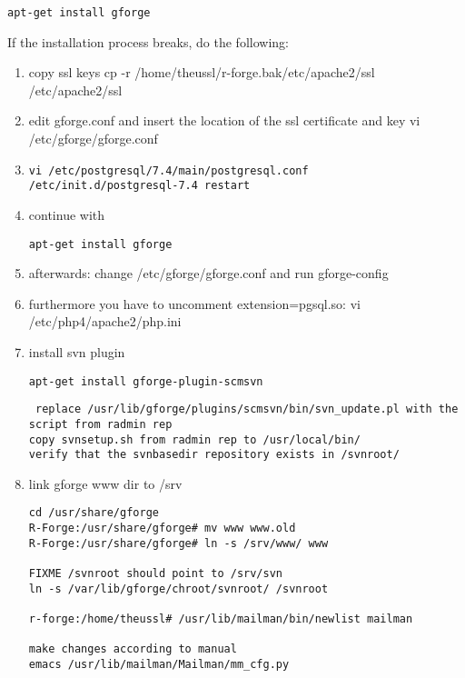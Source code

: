 \documentclass[a4paper]{article}
\begin{document}
\begin{lstlisting}[frame=single, framerule=0.95pt]
apt-get install gforge
\end{lstlisting}


If the installation process breaks, do the following:
\begin{enumerate}
\item copy ssl keys
cp -r /home/theussl/r-forge.bak/etc/apache2/ssl /etc/apache2/ssl
\item edit gforge.conf and insert the location of the ssl certificate and key
vi /etc/gforge/gforge.conf
\item 
\begin{lstlisting}
vi /etc/postgresql/7.4/main/postgresql.conf
/etc/init.d/postgresql-7.4 restart
\end{lstlisting}

\item continue with 

\begin{lstlisting}[frame=single, framerule=0.95pt]
apt-get install gforge
\end{lstlisting}

\item afterwards: change /etc/gforge/gforge.conf and run
gforge-config
\item furthermore you have to uncomment extension=pgsql.so:
vi /etc/php4/apache2/php.ini

\item install svn plugin

\begin{lstlisting}[frame=single, framerule=0.95pt]
apt-get install gforge-plugin-scmsvn
\end{lstlisting}

\begin{lstlisting} replace /usr/lib/gforge/plugins/scmsvn/bin/svn_update.pl with the script from radmin rep
copy svnsetup.sh from radmin rep to /usr/local/bin/
verify that the svnbasedir repository exists in /svnroot/
\end{lstlisting}

\item link gforge www dir to /srv
\begin{lstlisting}
cd /usr/share/gforge
R-Forge:/usr/share/gforge# mv www www.old
R-Forge:/usr/share/gforge# ln -s /srv/www/ www

FIXME /svnroot should point to /srv/svn
ln -s /var/lib/gforge/chroot/svnroot/ /svnroot

r-forge:/home/theussl# /usr/lib/mailman/bin/newlist mailman

make changes according to manual
emacs /usr/lib/mailman/Mailman/mm_cfg.py
\end{lstlisting}
\end{enumerate}
\end{document}
